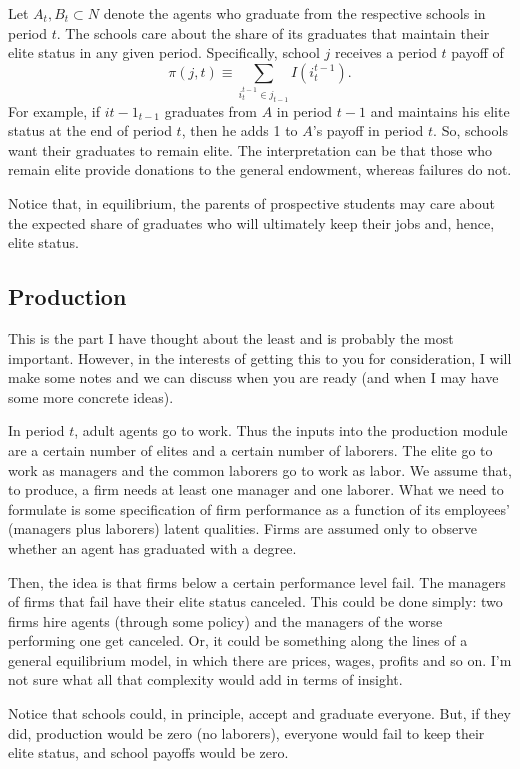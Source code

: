 \documentclass[
12pt,
titlepage,
reqno,
]{article}%
\begin{document}
Let $A_t,B_t\subset N$ denote the agents who graduate from the respective schools in period $t$.
The schools care about the share of its graduates that maintain their elite status in any given period.
Specifically, school $j$ receives a period $t$ payoff of
\[
\pi(j,t)\equiv \sum_{i^{t-1}_t\in j_{t-1}}I(i^{t-1}_t).
\]
For example, if $i{t-1}_{t-1}$ graduates from $A$ in period $t-1$ and maintains his elite status at the end of period $t$, then he adds 1 to $A$'s payoff in period $t$.
So, schools want their graduates to remain elite.
The interpretation can be that those who remain elite provide donations to the general endowment, whereas failures do not.

Notice that, in equilibrium, the parents of prospective students may care about the expected share of graduates who will ultimately keep their jobs and, hence, elite status. 

\subsection{Production}

This is the part I have thought about the least and is probably the most important. 
However, in the interests of getting this to you for consideration, I will make some notes and we can discuss when you are ready (and when I may have some more concrete ideas).

In period $t$, adult agents go to work. 
Thus the inputs into the production module are a certain number of elites and a certain number of laborers.
The elite go to work as managers and the common laborers go to work as labor. 
We assume that, to produce, a firm needs at least one manager and one laborer. 
What we need to formulate is some specification of firm performance as a function of its employees' (managers plus laborers) latent qualities. 
Firms are assumed only to observe whether an agent has graduated with a degree.

Then, the idea is that firms below a certain performance level fail.
The managers of firms that fail have their elite status canceled.
This could be done simply: two firms hire agents (through some policy) and the managers of the worse performing one get canceled.
Or, it could be something along the lines of a general equilibrium model, in which there are prices, wages, profits and so on.
I'm not sure what all that complexity would add in terms of insight. 

Notice that schools could, in principle, accept and graduate everyone.
But, if they did, production would be zero (no laborers), everyone would fail to keep their elite status, and school payoffs would be zero.
\end{document}
